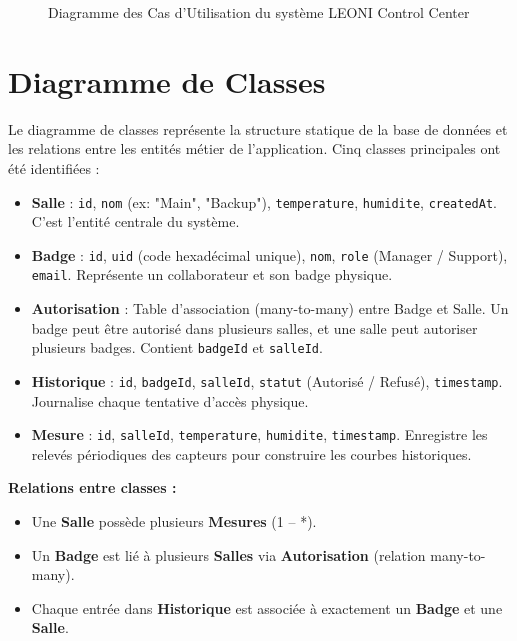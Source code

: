 \documentclass[12pt,a4paper]{report}
\begin{document}
\begin{figure}[h]
    \centering
    \caption{Diagramme des Cas d'Utilisation du système LEONI Control Center}
\end{figure}

\section{Diagramme de Classes}

Le diagramme de classes représente la structure statique de la base de données et les relations entre les entités métier de l'application. Cinq classes principales ont été identifiées :

\begin{itemize}
    \item \textbf{Salle} : \texttt{id}, \texttt{nom} (ex: "Main", "Backup"), \texttt{temperature}, \texttt{humidite}, \texttt{createdAt}. C'est l'entité centrale du système.
    \item \textbf{Badge} : \texttt{id}, \texttt{uid} (code hexadécimal unique), \texttt{nom}, \texttt{role} (Manager / Support), \texttt{email}. Représente un collaborateur et son badge physique.
    \item \textbf{Autorisation} : Table d'association (many-to-many) entre Badge et Salle. Un badge peut être autorisé dans plusieurs salles, et une salle peut autoriser plusieurs badges. Contient \texttt{badgeId} et \texttt{salleId}.
    \item \textbf{Historique} : \texttt{id}, \texttt{badgeId}, \texttt{salleId}, \texttt{statut} (Autorisé / Refusé), \texttt{timestamp}. Journalise chaque tentative d'accès physique.
    \item \textbf{Mesure} : \texttt{id}, \texttt{salleId}, \texttt{temperature}, \texttt{humidite}, \texttt{timestamp}. Enregistre les relevés périodiques des capteurs pour construire les courbes historiques.
\end{itemize}

\textbf{Relations entre classes :}
\begin{itemize}
    \item Une \textbf{Salle} possède plusieurs \textbf{Mesures} (1 -- *).
    \item Un \textbf{Badge} est lié à plusieurs \textbf{Salles} via \textbf{Autorisation} (relation many-to-many).
    \item Chaque entrée dans \textbf{Historique} est associée à exactement un \textbf{Badge} et une \textbf{Salle}.
\end{itemize}
\end{document}
